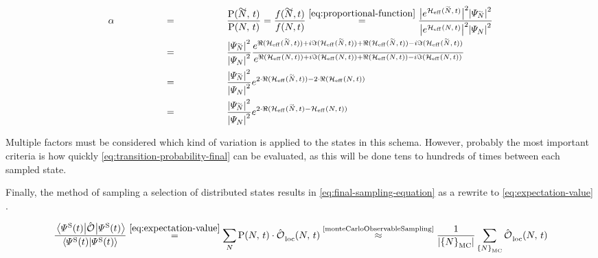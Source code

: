 \begin{equation}
    \label{eq:transition-probability-final}
    \begin{split}
        \alpha &\stackrel{\phantom{\ref{eq:proportional-function}}}{=} \frac{\probabilityOf{\vphantom{N}\smash{\tilde{N}}}{t}}{\probabilityOf{N}{t}} =  \frac{f(\vphantom{N}\smash{\tilde{N}},t)}{f(N,t)}
        \stackrel{\ref{eq:proportional-function}}{=}
        \frac{
            \absSquare{e^{\HeffOft[\vphantom{N}\smash{\tilde{N}}]}} \absSquare{\psiN[\vphantom{N}\smash{\tilde{N}}]}
        }{
            \absSquare{e^{\HeffOft}} \absSquare{\psiN}
        }\\
        &\stackrel{\phantom{\ref{eq:proportional-function}}}{=}
        \frac{\absSquare{\psiN[\vphantom{N}\smash{\tilde{N}}]}}{\absSquare{\psiN}}
        \frac{
            e^{\real\left(\HeffOft[\vphantom{N}\smash{\tilde{N}}]\right) + i\imaginary\left(\HeffOft[\vphantom{N}\smash{\tilde{N}}]\right) +\real\left(\HeffOft[\vphantom{N}\smash{\tilde{N}}]\right)-i \imaginary\left(\HeffOft[\vphantom{N}\smash{\tilde{N}}]\right)}
        }{
            e^{\real\left(\HeffOft\right) + i\imaginary\left(\HeffOft\right) +\real\left(\HeffOft\right)-i \imaginary\left(\HeffOft\right)}
        }\\
        &\stackrel{\phantom{\ref{eq:proportional-function}}}{=}
        \frac{\absSquare{\psiN[\vphantom{N}\smash{\tilde{N}}]}}{\absSquare{\psiN}}
        e^{2\cdot \real\left(\HeffOft[\vphantom{N}\smash{\tilde{N}}]\right) - 2\cdot \real\left(\HeffOft\right)}\\
        &\stackrel{\phantom{\ref{eq:proportional-function}}}{=}
        \frac{\absSquare{\psiN[\vphantom{N}\smash{\tilde{N}}]}}{\absSquare{\psiN}}
        e^{2\cdot \real\left(\HeffOft[\vphantom{N}\smash{\tilde{N}}] - \HeffOft\right)}
    \end{split}
\end{equation}

Multiple factors must be considered which kind of variation is applied to the states in this schema. 
However, probably the most important criteria is how quickly \autoref{eq:transition-probability-final} can be evaluated, as this will be done tens to hundreds of times between each sampled state.

Finally, the method of sampling a selection of distributed states results in \autoref{eq:final-sampling-equation} as a rewrite to \autoref{eq:expectation-value} \cite{monteCarloObservableSampling}.

\begin{equation}
    \label{eq:final-sampling-equation}
    \frac{\bracketHelper{\psiOfT[\schroedingerPicture]}{\ObservableOp}{\psiOfT[\schroedingerPicture]}}{\braketHelper{\psiOfT[\schroedingerPicture]}{\psiOfT[\schroedingerPicture]}} \stackrel{\ref{eq:expectation-value}}{=} 
    \lsum[N]
    \probabilityOf{N}{t} \cdot
    \localObservable{N}{t}
    \stackrel{\text{\cite{monteCarloObservableSampling}}}{\approx} \frac{1}{\left|\left\{N\right\}_\text{MC}\right|} \lsum[\left\{N\right\}_\text{MC}]\localObservable{N}{t}
\end{equation}